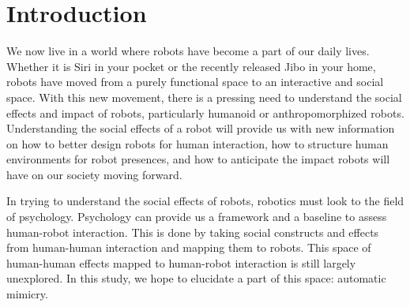\documentclass{acm_proc_article-sp}
\begin{document}
\maketitle
\begin{abstract}
This paper provides a sample of a \LaTeX\ document which conforms to
the formatting guidelines for ACM SIG Proceedings.
It complements the document \textit{Author's Guide to Preparing
ACM SIG Proceedings Using \LaTeX$2_\epsilon$\ and Bib\TeX}. This
source file has been written with the intention of being
compiled under \LaTeX$2_\epsilon$\ and BibTeX.

The developers have tried to include every imaginable sort
of ``bells and whistles", such as a subtitle, footnotes on
title, subtitle and authors, as well as in the text, and
every optional component (e.g. Acknowledgments, Additional
Authors, Appendices), not to mention examples of
equations, theorems, tables and figures.

To make best use of this sample document, run it through \LaTeX\
and BibTeX, and compare this source code with the printed
output produced by the dvi file.
\end{abstract}


\section{Introduction}
We now live in a world where robots have become a part of our daily lives. Whether it is Siri in your pocket or the recently released Jibo in your home, robots have moved from a purely functional space to an interactive and social space. With this new movement, there is a pressing need to understand the social effects and impact of robots, particularly humanoid or anthropomorphized robots. Understanding the social effects of a robot will provide us with new information on how to better design robots for human interaction, how to structure human environments for robot presences, and how to anticipate the impact robots will have on our society moving forward. 

In trying to understand the social effects of robots, robotics must look to the field of psychology. Psychology can provide us a framework and a baseline to assess human-robot interaction. This is done by taking social constructs and effects from human-human interaction and mapping them to robots. This space of human-human effects mapped to human-robot interaction is still largely unexplored. In this study, we hope to elucidate a part of this space: automatic mimicry.
\end{document}

